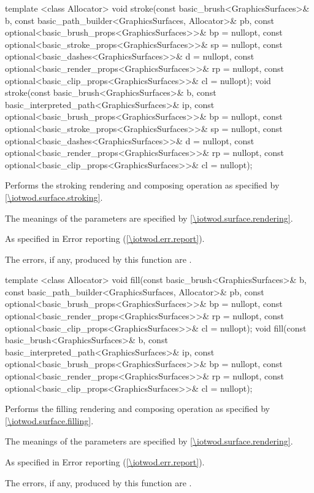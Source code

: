 %
\begin{itemdecl}
template <class Allocator>
void stroke(const basic_brush<GraphicsSurfaces>& b,
  const basic_path_builder<GraphicsSurfaces, Allocator>& pb,
  const optional<basic_brush_props<GraphicsSurfaces>>& bp = nullopt,
  const optional<basic_stroke_props<GraphicsSurfaces>>& sp = nullopt,
  const optional<basic_dashes<GraphicsSurfaces>>& d = nullopt,
  const optional<basic_render_props<GraphicsSurfaces>>& rp = nullopt,
  const optional<basic_clip_props<GraphicsSurfaces>>& cl = nullopt);
void stroke(const basic_brush<GraphicsSurfaces>& b,
  const basic_interpreted_path<GraphicsSurfaces>& ip,
  const optional<basic_brush_props<GraphicsSurfaces>>& bp = nullopt,
  const optional<basic_stroke_props<GraphicsSurfaces>>& sp = nullopt,
  const optional<basic_dashes<GraphicsSurfaces>>& d = nullopt,
  const optional<basic_render_props<GraphicsSurfaces>>& rp = nullopt,
  const optional<basic_clip_props<GraphicsSurfaces>>& cl = nullopt);
\end{itemdecl}
\begin{itemdescr}
\pnum
\effects
Performs the stroking rendering and composing operation as specified by \ref{\iotwod.surface.stroking}.

\pnum
The meanings of the parameters are specified by \ref{\iotwod.surface.rendering}.

\pnum
\throws
As specified in Error reporting (\ref{\iotwod.err.report}).

\pnum
\errors
The errors, if any, produced by this function are .
\end{itemdescr}

%
\begin{itemdecl}
template <class Allocator>
void fill(const basic_brush<GraphicsSurfaces>& b,
  const basic_path_builder<GraphicsSurfaces, Allocator>& pb,
  const optional<basic_brush_props<GraphicsSurfaces>>& bp = nullopt,
  const optional<basic_render_props<GraphicsSurfaces>>& rp = nullopt,
  const optional<basic_clip_props<GraphicsSurfaces>>& cl = nullopt);
void fill(const basic_brush<GraphicsSurfaces>& b,
  const basic_interpreted_path<GraphicsSurfaces>& ip,
  const optional<basic_brush_props<GraphicsSurfaces>>& bp = nullopt,
  const optional<basic_render_props<GraphicsSurfaces>>& rp = nullopt,
  const optional<basic_clip_props<GraphicsSurfaces>>& cl = nullopt);
\end{itemdecl}
\begin{itemdescr}
\pnum
\effects
Performs the filling rendering and composing operation as specified by \ref{\iotwod.surface.filling}.

\pnum
The meanings of the parameters are specified by \ref{\iotwod.surface.rendering}.

\pnum
\throws
As specified in Error reporting (\ref{\iotwod.err.report}).

\pnum
\errors
The errors, if any, produced by this function are .
\end{itemdescr}

